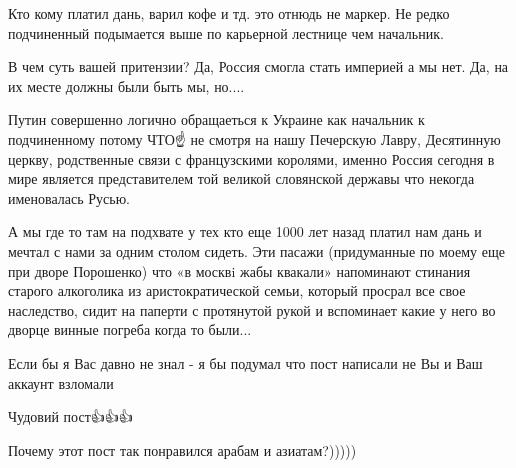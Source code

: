 \begin{itemize}
 

Кто кому платил дань, варил кофе и тд. это отнюдь не маркер. Не редко
подчиненный подымается выше по карьерной лестнице чем начальник. 

В чем суть вашей притензии? Да, Россия смогла стать империей а мы нет. Да, на
их месте должны были быть мы, но.... 

Путин совершенно логично обращаеться к Украине как начальник к подчиненному
потому ЧТО☝️ не смотря на нашу Печерскую Лавру, Десятинную церкву, родственные
связи с французскими королями, именно Россия сегодня в мире является
представителем той великой словянской державы что некогда именовалась Русью. 

А мы где то там на подхвате у тех кто еще 1000 лет назад платил нам дань и
мечтал с нами за одним столом сидеть. Эти пасажи (придуманные по моему еще при
дворе Порошенко) что «в москвi жабы квакали» напоминают стинания старого
алкоголика из аристократической семьи, который просрал все свое наследство,
сидит на паперти с протянутой рукой и вспоминает какие у него во дворце винные
погреба когда то были...

 
Если бы я Вас давно не знал - я бы подумал что пост написали не Вы и Ваш аккаунт взломали 🤣

 
Чудовий пост👍👍👍

 
Почему этот пост так понравился арабам и азиатам?)))))

 

\end{itemize}
